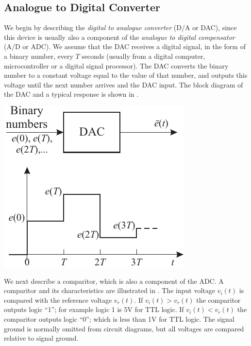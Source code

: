 \subsection*{Analogue to Digital Converter}

We begin by describing the \emph{digital to analogue converter} (D/A
or DAC), since this device is usually also a component of the
\emph{analogue to digital compensator} (A/D or ADC). We assume that
the DAC receives a digital signal, in the form of a binary number,
every $T$ seconds (usually from a digital computer, microcontroller or
a digital signal processor). The DAC converts the binary number to a
constant voltage equal to the value of that number, and outputs this
voltage until the next number arrives and the DAC input. The block
diagram of the DAC and a typical response is shown in
.

\begin{slide}\label{slide:DAC}
\begin{center}
  \includegraphics{pictures/DAC.pdf}
\end{center}
\end{slide}

We next describe a comparitor, which is also a component of the ADC. A
comparitor and its characteristics are illustrated in
. The input voltage $v_i(t)$ is compared with the
reference voltage $v_r(t)$.  If $v_i(t) > v_r(t)$ the comparitor
outputs logic ``1''; for example logic 1 is 5V for TTL logic.  If
$v_i(t) < v_r(t)$ the comparitor outputs logic ``0''; which is less
than 1V for TTL logic. The signal ground is normally omitted from
circuit diagrams, but all voltages are compared relative to signal
ground.

